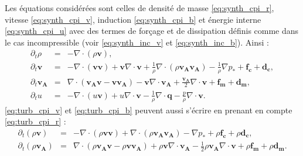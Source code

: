 Les équations considérées sont celles de densité de masse \eqref{eq:synth_cpi_r}, vitesse  \eqref{eq:synth_cpi_v}, induction \eqref{eq:synth_cpi_b} et énergie interne  \eqref{eq:synth_cpi_u} avec des termes de forçage et de dissipation définis comme dans le cas incompressible (voir \eqref{eq:synth_inc_v} et \eqref{eq:synth_inc_b}). Ainsi :
\begin{eqnarray}
\label{eq:turb_cpi_r} \partial_t \rho &=& - \nabla \cdot \left(\rho \boldsymbol{v}\right), \\
\label{eq:turb_cpi_v}\partial_t  \boldsymbol{v} &=&- \nabla \cdot \left(\boldsymbol{v}\boldsymbol{v}\right) + \boldsymbol{v} \nabla \cdot \boldsymbol{v}  + \frac{1}{\rho} \nabla \cdot \left(\rho \boldsymbol{v_A}\boldsymbol{v_A}\right) - \frac{1}{\rho}  \nabla p_*  + \boldsymbol{f_c} + \boldsymbol{d_c} ,\\
\label{eq:turb_cpi_b}\partial_t \boldsymbol{v_A} &=&   \nabla \cdot \left(\boldsymbol{v_A}\boldsymbol{v} - \boldsymbol{v}\boldsymbol{v_A}\right) -  \boldsymbol{v}  \nabla \cdot \boldsymbol{v_A} +  \frac{\boldsymbol{v_A}}{2}  \nabla \cdot \boldsymbol{v} + \boldsymbol{f_m} + \boldsymbol{d_m} ,\\
\label{eq:turb_cpi_u}\partial_t u &=& - \nabla \cdot \left(u \boldsymbol{v}\right) + u  \nabla \cdot \boldsymbol{v} -\frac{1}{\rho} \nabla \cdot \boldsymbol{q}  - \frac{p}{\rho}  \nabla \cdot \boldsymbol{v} .
\end{eqnarray}
\eqref{eq:turb_cpi_v} et \eqref{eq:turb_cpi_b} peuvent aussi s'écrire en prenant en compte \eqref{eq:turb_cpi_r} :
\begin{eqnarray}
\label{eq:turb_cpi_v2}\partial_t  \left(\rho\boldsymbol{v}\right) &=&- \nabla \cdot \left(\rho \boldsymbol{v}\boldsymbol{v}\right)  + \nabla \cdot \left(\rho \boldsymbol{v_A}\boldsymbol{v_A}\right) -  \nabla p_*  + \rho \boldsymbol{f_c} + \rho\boldsymbol{d_c} ,\\
\label{eq:turb_cpi_b2}\partial_t \left(\rho\boldsymbol{v_A}\right) &=&   \nabla \cdot \left(\rho \boldsymbol{v_A}\boldsymbol{v} - \rho \boldsymbol{v}\boldsymbol{v_A}\right) +  \rho \boldsymbol{v}  \nabla \cdot \boldsymbol{v_A} - \frac{1}{2} \rho\boldsymbol{v_A} \nabla \cdot \boldsymbol{v} + \rho\boldsymbol{f_m} + \rho\boldsymbol{d_m}.
\end{eqnarray}

